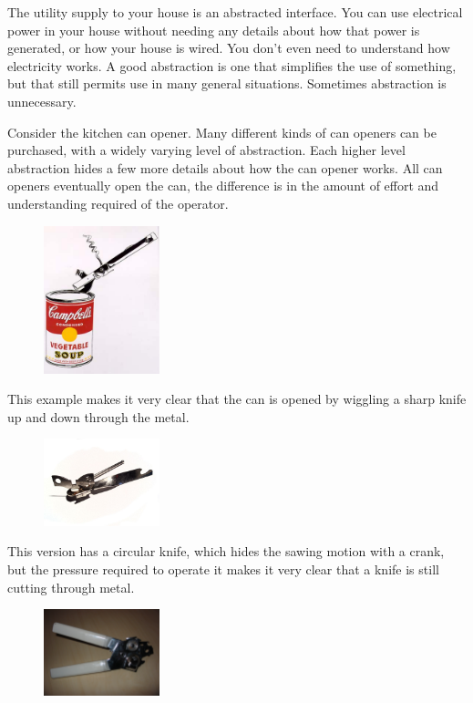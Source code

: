 The utility supply to your house is an abstracted interface. You can use electrical power in your house without needing any details about how that power is generated, or how your house is wired. You don't even need to understand how electricity works.
A good abstraction is one that simplifies the use of something, but that still permits use in many general situations. Sometimes abstraction is unnecessary.


Consider the kitchen can opener. Many different kinds of can openers can be purchased, with a widely varying level of abstraction. Each higher level abstraction hides a few more details about how the can opener works. All can openers eventually open the can, the difference is in the amount of effort and understanding required of the operator.

\begin{figure}[H]
\centering
\includegraphics[width=0.3\textwidth]{pictures/Campbell_s_Soup_with_Can_Opener.jpg}
\label{fig:canOpener1}
\end{figure}

This example makes it very clear that the can is opened by wiggling a sharp knife up and down through the metal.

\begin{figure}[H]
\centering
\includegraphics[width=0.3\textwidth]{pictures/800px-Can_Opener.jpg}
\label{fig:canOpener2}
\end{figure}

This version has a circular knife, which hides the sawing motion with a crank, but the pressure required to operate it makes it very clear that a knife is still cutting through metal.

\begin{figure}[H]
\centering
\includegraphics[width=0.3\textwidth]{pictures/Can_opener.JPG}
\label{fig:canOpener3}
\end{figure}


